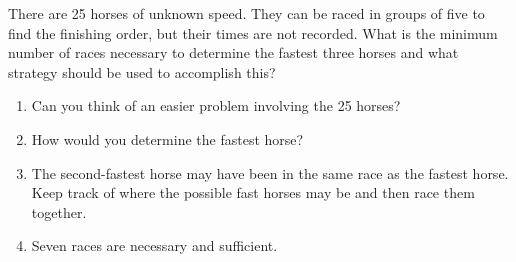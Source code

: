 \question
{}

There are 25 horses of unknown speed. They can be raced in groups of five to find the finishing order, but their times are not recorded. What is the minimum number of races necessary to determine the fastest three horses and what strategy should be used to accomplish this?

\begin{hints}
	\begin{enumerate}
		\item Can you think of an easier problem involving the 25 horses?
		\item How would you determine the fastest horse?
		\item The second-fastest horse may have been in the same race as the fastest horse. Keep track of where the possible fast horses may be and then race them together.
		\item Seven races are necessary and sufficient.
	\end{enumerate}
\end{hints}

